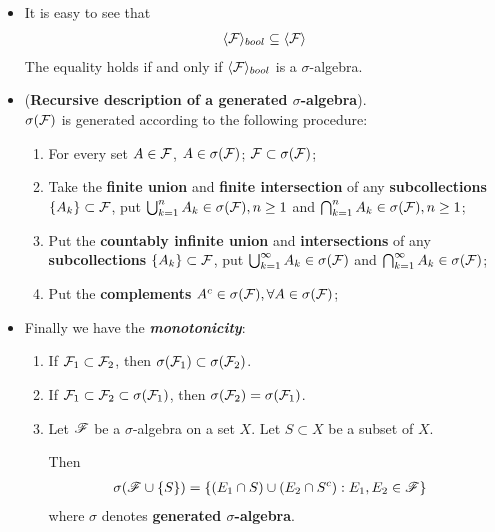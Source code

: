 \documentclass[11pt]{article}
\begin{document}
\begin{itemize}
\begin{example}
\begin{itemize}
\item It is easy to see that 
\begin{align*}
\langle {\mathcal F} \rangle_{bool} \subseteq \langle {\mathcal F} \rangle 
\end{align*} The equality holds if and only if $\langle {\mathcal F} \rangle_{bool}$ is a $\sigma$-algebra. 

\item \begin{proposition} (\textbf{Recursive description of a generated  $\sigma$-algebra}). \citep{tao2011introduction} \\
$\sigma({\mathcal F})$ is generated according to the following procedure: 
\begin{enumerate}
\item For every set $A \in {\mathcal F}$, $A\in \sigma({\mathcal F})$; ${\mathcal F} \subset \sigma({\mathcal F})$;
\item Take the \textbf{finite union} and \textbf{finite intersection} of any \textbf{subcollections} $\left\{A_{k}\right\}\subset {\mathcal F}$, put $\bigcup_{k=1}^{n}A_{k} \in \sigma({\mathcal F}), n\ge 1$ and  $\bigcap_{k=1}^{n}A_{k} \in \sigma({\mathcal F}), n\ge 1$;
\item Put the \textbf{countably infinite union} and \textbf{intersections} of any \textbf{subcollections} $\left\{A_{k}\right\}\subset {\mathcal F}$, put $\bigcup_{k=1}^{\infty}A_{k} \in \sigma({\mathcal F})$ and  $\bigcap_{k=1}^{\infty}A_{k} \in \sigma({\mathcal F})$;
\item Put the \textbf{complements} $A^{c} \in \sigma({\mathcal F}), \forall A\in \sigma({\mathcal F})$;
\end{enumerate}
\end{proposition}

\item Finally we have the \emph{\textbf{monotonicity}}: 
\begin{enumerate}
\item \begin{proposition}
 If ${\mathcal F}_{1} \subset {\mathcal F}_{2}$, then $\sigma({\mathcal F}_{1}) \subset \sigma({\mathcal F}_{2})$. 
 \end{proposition}
\item \begin{proposition}
  If ${\mathcal F}_{1}  \subset {\mathcal F}_{2} \subset \sigma({\mathcal F}_{1})$, then $\sigma({\mathcal F}_{2}) = \sigma({\mathcal F}_{1})$.
 \end{proposition}
\item \begin{proposition}
Let ${\mathscr F}$ be a $\sigma$-algebra on a set $X$. Let $S \subset X$ be a subset of $X$.

Then \begin{align*}
\sigma({\mathscr F}\cup \left\{S\right\}) &=\left\{(E_{1}\cap S)\cup (E_{2}\cap S^{c}): E_{1},E_{2}\in {\mathscr F}\right\}
\end{align*}
where $\sigma$ denotes \textbf{generated $\sigma$-algebra}.
\end{proposition}
\end{enumerate}
\end{itemize}


\end{example}
\end{itemize}
\end{document}
